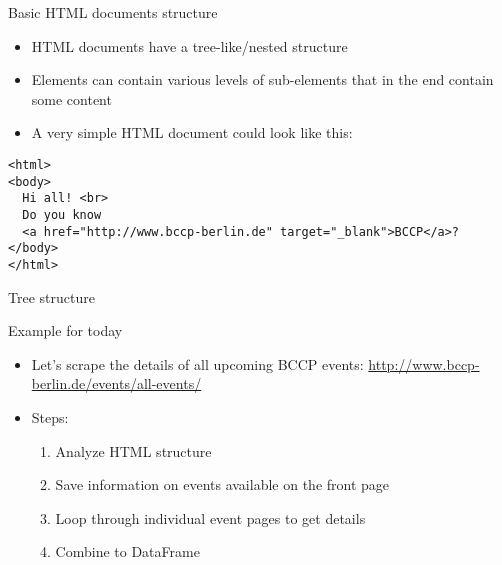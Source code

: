 \begin{frame}[fragile]{Basic HTML documents structure}
\begin{itemize}
	\item HTML documents have a tree-like/nested structure
	\item Elements can contain various levels of sub-elements that in the end contain some content
	\item A very simple HTML document could look like this:
\end{itemize}
\begin{verbatim}
<html>
<body>
  Hi all! <br>
  Do you know 
  <a href="http://www.bccp-berlin.de" target="_blank">BCCP</a>?
</body>
</html>
\end{verbatim}
\end{frame}

\begin{frame}{Tree structure}
\end{frame}

\begin{frame}{Example for today}
\begin{itemize}
	\item Let's scrape the details of all upcoming BCCP events: \url{http://www.bccp-berlin.de/events/all-events/}
	\item Steps:
		\begin{enumerate}
			\item Analyze HTML structure
			\item Save information on events available on the front page
			\item Loop through individual event pages to get details
			\item Combine to DataFrame
		\end{enumerate}
\end{itemize}
\end{frame}